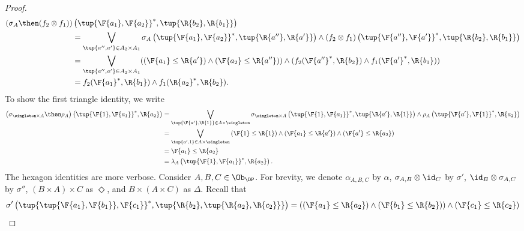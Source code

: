 \begin{proof}
    \begin{equation}
        \begin{aligned}
           \left( \sigma_A \then (f_2\otimes f_1)\right)&\left( \tup{\F{a_1},\F{a_2}}^*,\tup{\R{b_2},\R{b_1}}\right)\\
           &=\bigvee_{\tup{a'',a'}\in A_2\times A_1}\sigma_A\left(\tup{\F{a_1},\F{a_2}}^*,\tup{\R{a''},\R{a'}} \right)\wedge \left(f_2\otimes f_1\right) \left( \tup{\F{a''},\F{a'}}^*,\tup{\R{b_2},\R{b_1}}\right)\\
           &=\bigvee_{\tup{a'',a'}\in A_2\times A_1}(\left(\F{a_1}\leq \R{a'}\right)\wedge \left(\F{a_2}\leq \R{a''}\right)) \wedge (f_2(\F{a''}^*,\R{b_2})\wedge f_1(\F{a'}^*,\R{b_1}))\\
           &= f_2(\F{a_1}^*,\R{b_1}) \wedge f_1(\R{a_2}^*,\R{b_2}).
        \end{aligned}
    \end{equation}
    To show the first triangle identity, we write
    \begin{equation}
        \begin{aligned}
           \left(\sigma_{\singleton \times A}\then \rho_A\right)\left( \tup{\F{1},\F{a_1}}^*,\R{a_2}\right)&=\bigvee_{\tup{\F{a'},\R{1}}\in A\times \singleton}\sigma_{\singleton \times A}\left( \tup{\F{1},\F{a_1}}^*,\tup{\R{a'},\R{1}}\right)\wedge \rho_A\left( \tup{\F{a'},\F{1}}^*,\R{a_2}\right)\\
           &=\bigvee_{\tup{a',1}\in A\times \singleton} \left(\F{1}\leq \R{1}\right) \wedge \left(\F{a_1}\leq \R{a'}\right)\wedge \left(\F{a'}\leq \R{a_2}\right)\\
           &=\F{a_1}\leq \R{a_2}\\
           &=\lambda_A\left( \tup{\F{1},\F{a_1}}^*,\R{a_2}\right).
        \end{aligned}
    \end{equation}
    The hexagon identities are more verbose. Consider $A,B,C\in \Ob_\DP$. For brevity, we denote $\alpha_{A,B,C}$ by $\alpha$, $\sigma_{A,B}\otimes \id_C$ by $\sigma'$, $\id_B \otimes \sigma_{A,C}$ by $\sigma''$, $(B\times A)\times C$ as $\Diamond$, and $B\times (A\times C)$ as $\Delta$. Recall that
    \begin{equation}
        \begin{aligned}
            \sigma' \left(\tup{\tup{\F{a_1},\F{b_1}},\F{c_1}}^*,\tup{\R{b_2},\tup{\R{a_2},\R{c_2}}} \right)&=\left( (\F{a_1}\leq \R{a_2})  \wedge (\F{b_1}\leq \R{b_2})\right)\wedge (\F{c_1}\leq \R{c_2})\\

\end{aligned}
\end{equation}
\end{proof}

